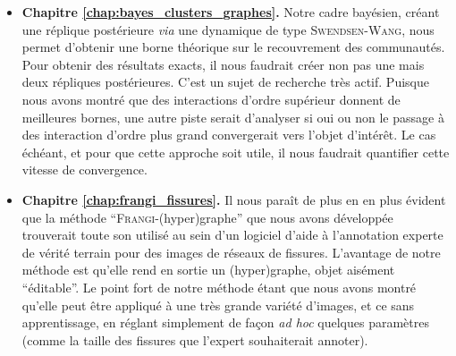 \begin{itemize}
    \item \textbf{Chapitre \ref{chap:bayes_clusters_graphes}.} Notre cadre bayésien, créant une réplique postérieure \emph{via} une dynamique de type \textsc{Swendsen-Wang}, nous permet d'obtenir une borne théorique sur le recouvrement des communautés. Pour obtenir des résultats exacts, il nous faudrait créer non pas une mais deux répliques postérieures. C'est un sujet de recherche très actif. Puisque nous avons montré que des interactions d'ordre supérieur donnent de meilleures bornes, une autre piste serait d'analyser si oui ou non le passage à des interaction d'ordre plus grand convergerait vers l'objet d'intérêt. Le cas échéant, et pour que cette approche soit utile, il nous faudrait quantifier cette vitesse de convergence.
    \item \textbf{Chapitre \ref{chap:frangi_fissures}.} Il nous paraît de plus en en plus évident que la méthode ``\textsc{Frangi}-(hyper)graphe'' que nous avons développée trouverait toute son utilisé au sein d'un logiciel d'aide à l'annotation experte de vérité terrain pour des images de réseaux de fissures. L'avantage de notre méthode est qu'elle rend en sortie un (hyper)graphe,  objet aisément ``éditable''. Le point fort de notre méthode étant que nous avons montré qu'elle peut être appliqué à une très grande variété d'images, et ce sans apprentissage, en réglant simplement de façon \emph{ad hoc} quelques paramètres (comme la taille des fissures que l'expert souhaiterait annoter).
\end{itemize}
